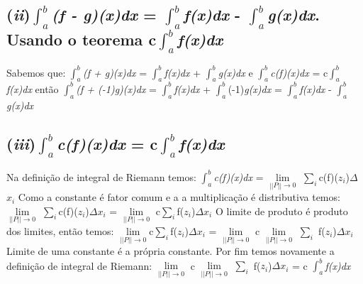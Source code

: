 \subsection{(\textit{ii})$\int_{a}^{b}$\textit{(f - g)(x)dx} = $\int_{a}^{b}$\textit{f(x)dx} - $\int_{a}^{b}$\textit{g(x)dx}. Usando o teorema c$\int_{a}^{b}$\textit{f(x)dx}}
Sabemos que: $\int_{a}^{b}$\textit{(f + g)(x)dx} = $\int_{a}^{b}$\textit{f(x)dx} + $\int_{a}^{b}$\textit{g(x)dx} e $\int_{a}^{b}$\textit{c(f)(x)dx} = c$\int_{a}^{b}$\textit{f(x)dx} então \newline
$\int_{a}^{b}$\textit{(f + (-1)g)(x)dx} = $\int_{a}^{b}$\textit{f(x)dx} + $\int_{a}^{b}$(-1)\textit{g(x)dx} = $\int_{a}^{b}$\textit{f(x)dx} - $\int_{a}^{b}$\textit{g(x)dx}

\subsection{(\textit{iii})$\int_{a}^{b}$\textit{c(f)(x)dx} = c$\int_{a}^{b}$\textit{f(x)dx}}
Na definição de integral de Riemann temos:\newline
$\int_{a}^{b}$\textit{c(f)(x)}\textit{dx}  = $\lim\limits_{||P||\rightarrow 0}$ $\sum_{i}$c(f)($z_i$)$\Delta$$x_i$ \newline
Como a constante é fator comum e a a multiplicação é distributiva temos: \newline
$\lim\limits_{||P||\rightarrow 0}$ $\sum_{i}$c(f)($z_i$)$\Delta$$x_i$ = 
$\lim\limits_{||P||\rightarrow 0}$ c$\sum_{i}$f($z_i$)$\Delta$$x_i$\newline
O limite de produto é produto dos limites, então temos: \newline
$\lim\limits_{||P||\rightarrow 0}$c$\sum_{i}$f($z_i$)$\Delta$$x_i$ = $\lim\limits_{||P||\rightarrow 0}$ c $\lim\limits_{||P||\rightarrow 0}$ $\sum_{i}$ f($z_i$)$\Delta$$x_i$ \newline
Limite de uma constante é a própria constante. Por fim temos novamente a definição de integral de Riemann:\newline
$\lim\limits_{||P||\rightarrow 0}$ c $\lim\limits_{||P||\rightarrow 0}$ $\sum_{i}$ f($z_i$)$\Delta$$x_i$ = c $\int_{a}^{b}$\textit{f(x)dx}
